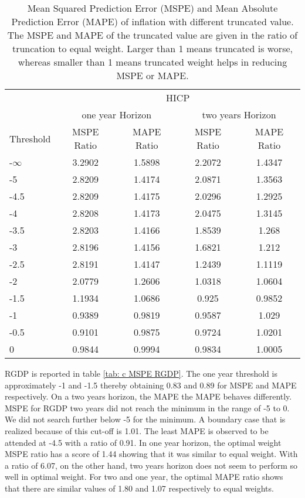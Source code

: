 \documentclass[11pt]{article}
\begin{document}
\begin{table}[!h]
	\centering
	\caption{Mean Squared Prediction Error (MSPE) and Mean Absolute Prediction Error (MAPE) of inflation with different truncated value. The MSPE and MAPE of the truncated value are given in the ratio of truncation to equal weight. Larger than 1 means truncated is worse, whereas smaller than 1 means truncated weight helps in reducing MSPE or MAPE.}
	\label{tab: c MSPE HICP}
	\begin{tabular}{lcccc}
		\hline\hline
		&                        \multicolumn{4}{c}{HICP}                         \\
		\cmidrule(lr){2-5}                              & \multicolumn{2}{c}{one year Horizon} & \multicolumn{2}{c}{two years Horizon} \\
		\cmidrule(lr){2-3} \cmidrule(lr){4-5}
		Threshold & MSPE Ratio &    MAPE Ratio    & MSPE Ratio &    MAPE Ratio    \\ \hline
-$\infty$ & 3.2902 & 1.5898 & 2.2072 & 1.4347\\ 
-5 & 2.8209 & 1.4174 & 2.0871 & 1.3563\\ 
-4.5 & 2.8209 & 1.4175 & 2.0296 & 1.2925\\ 
-4 & 2.8208 & 1.4173 & 2.0475 & 1.3145\\ 
-3.5 & 2.8203 & 1.4166 & 1.8539 & 1.268\\ 
-3 & 2.8196 & 1.4156 & 1.6821 & 1.212\\ 
-2.5 & 2.8191 & 1.4147 & 1.2439 & 1.1119\\ 
-2 & 2.0779 & 1.2606 & 1.0318 & 1.0604\\ 
-1.5 & 1.1934 & 1.0686 & 0.925 & 0.9852\\ 
-1 & 0.9389 & 0.9819 & 0.9587 & 1.029\\ 
-0.5 & 0.9101 & 0.9875 & 0.9724 & 1.0201\\ 
0 & 0.9844 & 0.9994 & 0.9834 & 1.0005\\ 
\hline\hline
	\end{tabular}
\end{table}

RGDP is reported in table \ref{tab: c MSPE RGDP}.  The one year threshold is approximately -1 and -1.5 thereby obtaining 0.83 and 0.89 for MSPE and MAPE respectively. On a two years horizon, the MAPE the MAPE behaves differently. MSPE for RGDP two years did not reach the minimum in the range of -5 to 0. We did not search further below -5 for the minimum. A boundary case that is realized because of this cut-off is 1.01. The least MAPE is observed to be attended at -4.5 with a ratio of 0.91. In one year horizon, the optimal weight MSPE ratio has a score of 1.44 showing that it was similar to equal weight. With a ratio of 6.07, on the other hand, two years horizon does not seem to perform so well in optimal weight. For two and one year, the optimal MAPE ratio shows that there are similar values of 1.80 and 1.07 respectively to equal weights.
\end{document}
